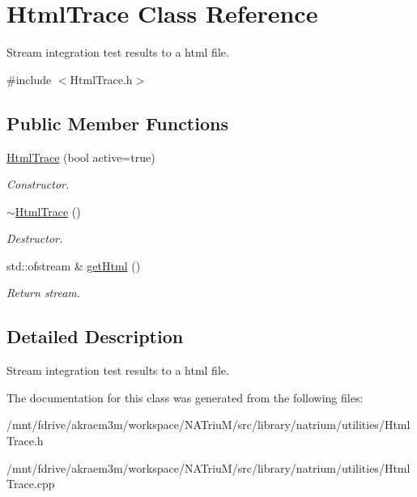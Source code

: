 \hypertarget{classHtmlTrace}{
\section{HtmlTrace Class Reference}
\label{classHtmlTrace}
}


Stream integration test results to a html file.  


{\ttfamily \#include $<$HtmlTrace.h$>$}\subsection*{Public Member Functions}
\begin{DoxyCompactItemize}
\item 
\hypertarget{classHtmlTrace_aea8d1172bceb532eac4978e42222477e}{
\hyperlink{classHtmlTrace_aea8d1172bceb532eac4978e42222477e}{HtmlTrace} (bool active=true)}
\label{classHtmlTrace_aea8d1172bceb532eac4978e42222477e}

\begin{DoxyCompactList}\small\item\em Constructor. \item\end{DoxyCompactList}\item 
\hypertarget{classHtmlTrace_a27003513f2782cbd57bf387a1fca8be5}{
\hyperlink{classHtmlTrace_a27003513f2782cbd57bf387a1fca8be5}{$\sim$HtmlTrace} ()}
\label{classHtmlTrace_a27003513f2782cbd57bf387a1fca8be5}

\begin{DoxyCompactList}\small\item\em Destructor. \item\end{DoxyCompactList}\item 
\hypertarget{classHtmlTrace_a334a99ca80288f4b25ee6e5d02edf679}{
std::ofstream \& \hyperlink{classHtmlTrace_a334a99ca80288f4b25ee6e5d02edf679}{getHtml} ()}
\label{classHtmlTrace_a334a99ca80288f4b25ee6e5d02edf679}

\begin{DoxyCompactList}\small\item\em Return stream. \item\end{DoxyCompactList}\end{DoxyCompactItemize}


\subsection{Detailed Description}
Stream integration test results to a html file. 

The documentation for this class was generated from the following files:\begin{DoxyCompactItemize}
\item 
/mnt/fdrive/akraem3m/workspace/NATriuM/src/library/natrium/utilities/HtmlTrace.h\item 
/mnt/fdrive/akraem3m/workspace/NATriuM/src/library/natrium/utilities/HtmlTrace.cpp\end{DoxyCompactItemize}
